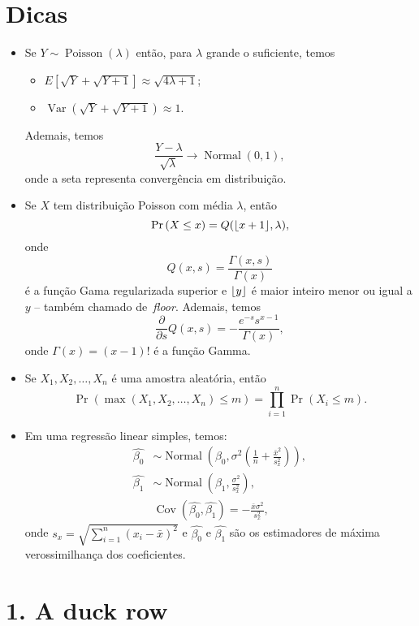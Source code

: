 \documentclass[a4paper,10pt, notitlepage]{report}
\newcommand{\pr}{\operatorname{Pr}} %
\newcommand{\vr}{\operatorname{Var}} %
\newcommand{\rs}{X_1, X_2, \ldots, X_n} %
\DeclarePairedDelimiter\floor{\lfloor}{\rfloor}
\begin{document}
\section*{Dicas}
\begin{itemize}
 \item Se $Y \sim \operatorname{Poisson}(\lambda)$ então, para $\lambda$ grande o suficiente, temos
 \begin{itemize}
  \item $E[\sqrt{Y} + \sqrt{Y+1}] \approx \sqrt{4\lambda + 1}$;
  \item $\vr(\sqrt{Y} + \sqrt{Y+1}) \approx 1$. 
 \end{itemize} 
 Ademais, temos
 \begin{equation*}
 \frac{Y-\lambda}{\sqrt{\lambda}} \to \operatorname{Normal}(0, 1),
 \end{equation*}
 onde a seta representa convergência em distribuição.
 \item Se $X$ tem distribuição Poisson com média $\lambda$, então
 \[\pr\left(X \leq x\right) = Q(\floor*{x + 1}, \lambda), \]
 onde $$Q(x, s) = \frac{\Gamma(x, s)}{\Gamma(x)}$$ é a função Gama regularizada superior e $\floor*{y}$ é maior inteiro menor ou igual a $y$ -- também chamado de~\textit{floor}.
 Ademais, temos
\[ \frac{\partial}{\partial s} Q(x, s) = -\frac{e^{-s}s^{x-1}}{\Gamma(x)},\]
onde $\Gamma(x) = (x-1)!$ é a função Gamma.
\item  Se $\rs$ é uma amostra aleatória, então
\begin{equation*}
 \pr\left( \max(\rs) \leq m \right) = \prod_{i=1}^n \pr(X_i \leq m).
\end{equation*}
 \item Em uma regressão linear simples, temos:
  \begin{align*}
  \hat{\beta_0} &\sim \operatorname{Normal}\left(\beta_0, \sigma^2 \left( \frac{1}{n} + \frac{\bar{x}^2}{s_x^2} \right) \right),\\
  \hat{\beta_1}  &\sim \operatorname{Normal}\left(\beta_1, \frac{\sigma^2}{s_x^2}\right),\\
  &\operatorname{Cov}\left(\hat{\beta_0}, \hat{\beta_1} \right)  = -\frac{\bar{x}\sigma^2}{s_x^2},
 \end{align*}
 onde $s_x = \sqrt{\sum_{i=1}^n (x_i-\bar{x})^2}$ e $\hat{\beta_0}$ e $\hat{\beta_1}$ são os estimadores de máxima verossimilhança dos coeficientes.
 \end{itemize}
 
\newpage

\section*{1. A duck row}
\end{document}
